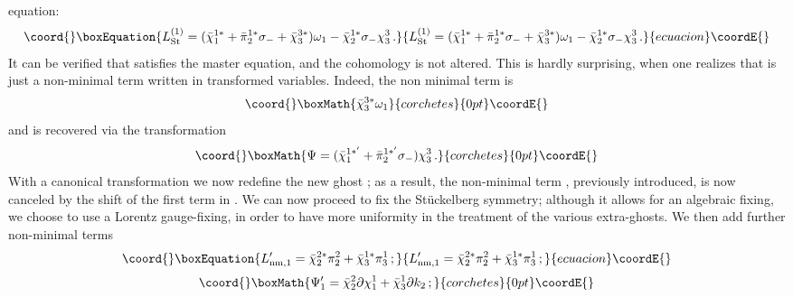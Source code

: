\documentclass[a4paper,12pt]{article}
\begin{document}
equation:
\begin{equation}\coord{}\boxEquation{
  L_{\rm St}^{(1)} = ({\bar\chi}_1^{1*}  + {\bar \pi}_2^{1*} \sigma_- 
  + {\bar\chi}_3^{3*}) \omega_1 - {\bar\chi}_2^{1*} \sigma_-
  \chi_3^3 \, .
}{
  L_{\rm St}^{(1)} = ({\bar\chi}_1^{1*}  + {\bar \pi}_2^{1*} \sigma_- 
  + {\bar\chi}_3^{3*}) \omega_1 - {\bar\chi}_2^{1*} \sigma_-
  \chi_3^3 \, .
}{ecuacion}\coordE{}\end{equation}
It can be verified that \coordHE{} satisfies the master
equation, and the cohomology is not altered.
This is hardly surprising, when one realizes that \coordHE{} is
just a non-minimal term written in transformed variables. Indeed, the
non minimal term is
\begin{displaymath}\coord{}\boxMath{
  {\bar\chi}_3^{3*} \omega_1
}{corchetes}{0pt}\coordE{}\end{displaymath}
and \coordHE{} is recovered via the transformation
\begin{displaymath}\coord{}\boxMath{
  \Psi = ({\bar\chi}_1^{{1*}'} + {\bar\pi}_2^{{1*}'} \sigma_-) \chi_3^3 \, .
}{corchetes}{0pt}\coordE{}\end{displaymath}
With a canonical transformation we now redefine the new ghost
\coordHE{} ; as a result, the non-minimal term
\coordHE{}, previously introduced, is now canceled by the
shift of the first term in \coordHE{}. We can now proceed to fix 
the St\"uckelberg symmetry; although it allows for an algebraic
fixing, we choose to use a Lorentz gauge-fixing, in order to have more 
uniformity in the treatment of the various extra-ghosts.  We then add
further non-minimal terms
\begin{equation}\coord{}\boxEquation{
  L_{\rm nm,1}' = {\bar\chi}_2^{2*} \pi_2^2 + {\bar\chi}_3^{1*} \pi_3^1 \, 
  ;
}{
  L_{\rm nm,1}' = {\bar\chi}_2^{2*} \pi_2^2 + {\bar\chi}_3^{1*} \pi_3^1 \, 
  ;
}{ecuacion}\coordE{}\end{equation}
\begin{displaymath}\coord{}\boxMath{
  \Psi_1' = \bar\chi_2^2 \partial \chi_1^1 + \bar\chi_3^1 \partial k_2 
  \, ;
}{corchetes}{0pt}\coordE{}\end{displaymath}
\end{document}

